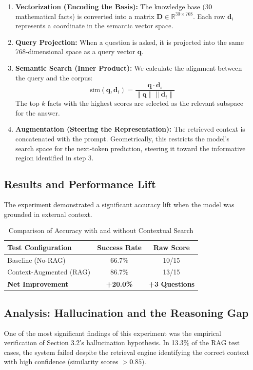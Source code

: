\documentclass[12pt,a4paper]{article}
\begin{document}
\begin{enumerate}
    \item \textbf{Vectorization (Encoding the Basis):} The knowledge base (30 mathematical facts) is converted into a matrix $\mathbf{D} \in \mathbb{R}^{30 \times 768}$. Each row $\mathbf{d}_i$ represents a coordinate in the semantic vector space.
    \item \textbf{Query Projection:} When a question is asked, it is projected into the same 768-dimensional space as a query vector $\mathbf{q}$.
    \item \textbf{Semantic Search (Inner Product):} We calculate the alignment between the query and the corpus:
    \begin{equation}
        \text{sim}(\mathbf{q}, \mathbf{d}_i) = \frac{\mathbf{q} \cdot \mathbf{d}_i}{\|\mathbf{q}\| \|\mathbf{d}_i\|}
    \end{equation}
    The top $k$ facts with the highest scores are selected as the relevant subspace for the answer.
    \item \textbf{Augmentation (Steering the Representation):} The retrieved context is concatenated with the prompt. Geometrically, this restricts the model's search space for the next-token prediction, steering it toward the informative region identified in step 3.
\end{enumerate}

\subsection{Results and Performance Lift}
The experiment demonstrated a significant accuracy lift when the model was grounded in external context.

\begin{table}[h]
\centering
\begin{tabular}{|l|c|c|}
\hline
\textbf{Test Configuration} & \textbf{Success Rate} & \textbf{Raw Score} \\ \hline
Baseline (No-RAG) & 66.7\% & 10/15 \\ \hline
Context-Augmented (RAG) & 86.7\% & 13/15 \\ \hline
\textbf{Net Improvement} & \textbf{+20.0\%} & \textbf{+3 Questions} \\ \hline
\end{tabular}
\caption{Comparison of Accuracy with and without Contextual Search}
\end{table}

\subsection{Analysis: Hallucination and the Reasoning Gap}
One of the most significant findings of this experiment was the empirical verification of Section 3.2's hallucination hypothesis. In 13.3\% of the RAG test cases, the system failed despite the retrieval engine identifying the correct context with high confidence (similarity scores $> 0.85$). 
\end{document}
